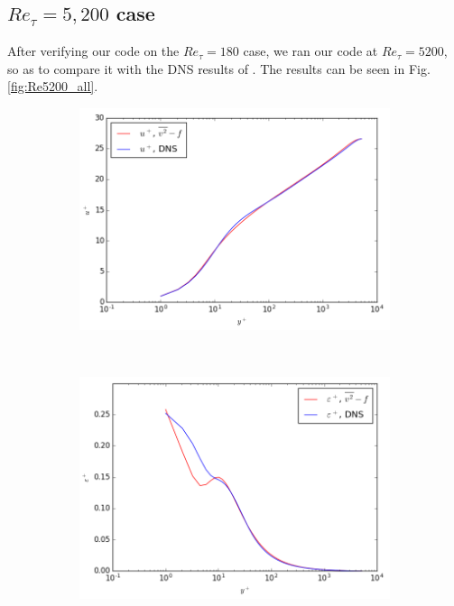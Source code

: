 \documentclass[a4paper,11pt]{article}
\begin{document}
\subsection{$Re_\tau = 5,200$ case}
After verifying our code on the $Re_{\tau} = 180$ case, we ran our code at $Re_{\tau} = 5200$, so as to compare it with the DNS results of \cite{Lee}. The results can be seen in Fig. \ref{fig:Re5200_all}.
\begin{figure}
	\centering
	\begin{subfigure}[b]{0.45\textwidth} %
		\includegraphics[width=\textwidth]{U_5200}
		\caption{}
		\label{fig:results_U_5200}
	\end{subfigure}
	~
	\begin{subfigure}[b]{0.45\linewidth} %
		\includegraphics[width=\textwidth]{eps_5200}
		\caption{}
		\label{fig:results_k_5200}
	\end{subfigure}
	

\end{figure}
\end{document}
